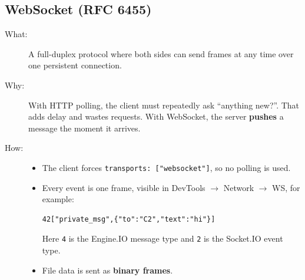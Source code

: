 \documentclass[11pt,a4paper]{article}
\newcommand{\code}[1]{\texttt{#1}}
\begin{document}
\subsection{WebSocket (RFC 6455)}
\begin{description}
  \item[What:] A full-duplex protocol where both sides can send frames at any
    time over one persistent connection.
  \item[Why:] With HTTP polling, the client must repeatedly ask ``anything new?''.
    That adds delay and wastes requests. With WebSocket, the server
    \textbf{pushes} a message the moment it arrives.
  \item[How:]
    \begin{itemize}
      \item The client forces \code{transports: ["websocket"]}, so no polling is used.
      \item Every event is one frame, visible in DevTools $\rightarrow$ Network
        $\rightarrow$ WS, for example:
\begin{lstlisting}
42["private_msg",{"to":"C2","text":"hi"}]
\end{lstlisting}
        Here \code{4} is the Engine.IO message type and \code{2} is the Socket.IO event type.
      \item File data is sent as \textbf{binary frames}.
    \end{itemize}
\end{description}
\end{document}
